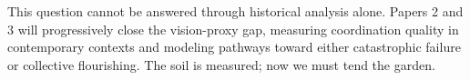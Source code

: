 \documentclass[11pt]{article}
\begin{document}
This question cannot be answered through historical analysis alone. Papers 2 and
3 will progressively close the vision-proxy gap, measuring coordination quality
in contemporary contexts and modeling pathways toward either catastrophic failure
or collective flourishing. The soil is measured; now we must tend the garden.

\end{document}
